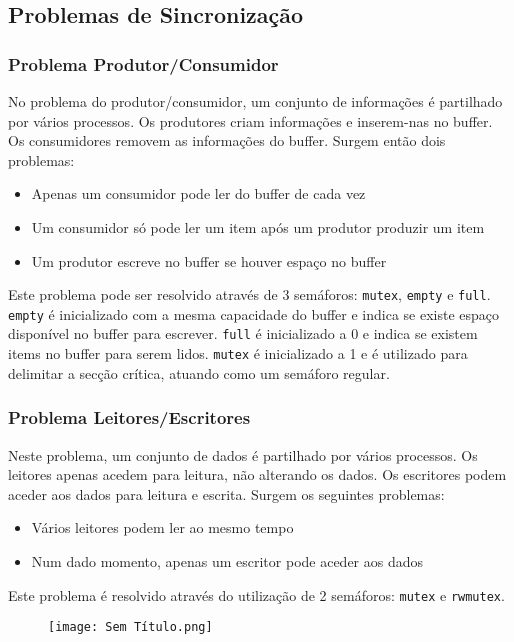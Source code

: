 \documentclass[10pt,a4paper]{report}
\begin{document}
\subsection{Problemas de Sincronização}
\subsubsection{Problema Produtor/Consumidor}
No problema do produtor/consumidor, um conjunto de informações é partilhado por vários processos. Os produtores criam informações e inserem-nas no buffer. Os consumidores removem as informações do buffer. Surgem então dois problemas:
\begin{itemize}
\item Apenas um consumidor pode ler do buffer de cada vez
\item Um consumidor só pode ler um item após um produtor produzir um item
\item Um produtor escreve no buffer se houver espaço no buffer
\end{itemize}
Este problema pode ser resolvido através de 3 semáforos: \texttt{mutex}, \texttt{empty} e \texttt{full}. \texttt{empty} é inicializado com a mesma capacidade do buffer e indica se existe espaço disponível no buffer para escrever. \texttt{full} é inicializado a 0 e indica se existem items no buffer para serem lidos. \texttt{mutex} é inicializado a 1 e é utilizado para delimitar a secção crítica, atuando como um semáforo regular.
\subsubsection{Problema Leitores/Escritores}
Neste problema, um conjunto de dados é partilhado por vários processos. Os leitores apenas acedem para leitura, não alterando os dados. Os escritores podem aceder aos dados para leitura e escrita. Surgem os seguintes problemas:
\begin{itemize}
\item Vários leitores podem ler ao mesmo tempo
\item Num dado momento, apenas um escritor pode aceder aos dados
\end{itemize}
Este problema é resolvido através do utilização de 2 semáforos: \texttt{mutex} e \texttt{rw\textunderscore mutex}.
\begin{figure}[H]
\centering
\texttt{[image: Sem Título.png]}
\end{figure}
\end{document}
